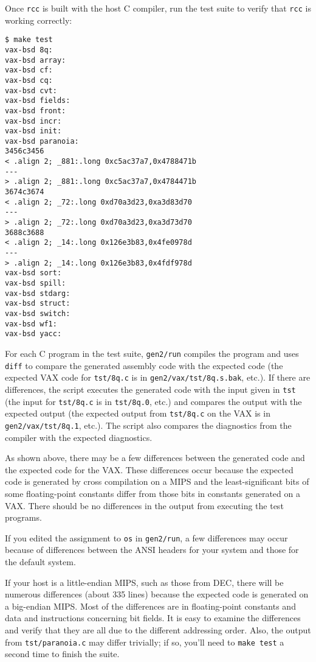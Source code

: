 Once \verb|rcc| is built with the host C compiler,
run the test suite to verify that \verb|rcc| is working correctly:
\begin{verbatim}
$ make test
vax-bsd 8q:
vax-bsd array:
vax-bsd cf:
vax-bsd cq:
vax-bsd cvt:
vax-bsd fields:
vax-bsd front:
vax-bsd incr:
vax-bsd init:
vax-bsd paranoia:
3456c3456
< .align 2; _881:.long 0xc5ac37a7,0x4788471b
---
> .align 2; _881:.long 0xc5ac37a7,0x4784471b
3674c3674
< .align 2; _72:.long 0xd70a3d23,0xa3d83d70
---
> .align 2; _72:.long 0xd70a3d23,0xa3d73d70
3688c3688
< .align 2; _14:.long 0x126e3b83,0x4fe0978d
---
> .align 2; _14:.long 0x126e3b83,0x4fdf978d
vax-bsd sort:
vax-bsd spill:
vax-bsd stdarg:
vax-bsd struct:
vax-bsd switch:
vax-bsd wf1:
vax-bsd yacc:
\end{verbatim}
For each C program in the test suite,
\verb|gen2/run| compiles the program and uses \verb|diff|
to compare the generated assembly code
with the expected code (the expected VAX code for \verb|tst/8q.c| is
in \verb|gen2/vax/tst/8q.s.bak|, etc.). If there are differences, the script
executes the generated code with the input given in \verb|tst|
(the input for \verb|tst/8q.c| is in \verb|tst/8q.0|, etc.)
and compares the output with the expected output
(the expected output from \verb|tst/8q.c| on the VAX is
in \verb|gen2/vax/tst/8q.1|, etc.). The script also compares the
diagnostics from the compiler with the expected diagnostics.

As shown above, there may be a few differences between the generated code
and the expected code for the VAX.
These differences occur because the expected code is
generated by cross compilation
on a MIPS and the least-significant bits of some floating-point constants
differ from those bits in constants generated on a VAX.
There should be no differences in the output from executing the test programs.

If you edited the assignment to \verb|os| in \verb|gen2/run|,
a few differences may occur because of differences between the ANSI headers
for your system and those for the default system.

If your host is a little-endian MIPS, such as those from DEC,
there will be numerous differences (about 335 lines) because the expected code
is generated on a big-endian MIPS. Most of the differences
are in floating-point constants and data and instructions
concerning bit fields. It is easy to examine
the differences and verify that they are all due to the different
addressing order. Also, the output from \verb|tst/paranoia.c|
may differ trivially; if so, you'll need to \verb|make test| a second
time to finish the suite.


